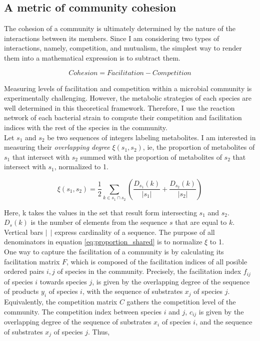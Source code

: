 \documentclass[titlepage,11pt]{article}
\begin{document}
\begin{linenumbers}
\begin{singlespace}
				\subsection{A metric of community cohesion}
					The cohesion of a community is ultimately determined by the nature of the interactions between its members. Since I am considering two types of interactions, namely, competition, and mutualism, the simplest way to render them into a mathematical expression is to subtract them.
					\begin{linenomath*}
						\begin{equation}\label{eq:cohesion_idea}
							Cohesion = Facilitation - Competition
						\end{equation}
					\end{linenomath*}
					Measuring levels of facilitation and competition within a microbial community is experimentally challenging. However, the metabolic strategies of each species are well determined in this theoretical framework. Therefore, I use the reaction network of each bacterial strain to compute their competition and facilitation indices with the rest of the species in the community.\\ 
					Let $ s_1 $ and $ s_2 $ be two sequences of integers labeling metabolites. I am interested in measuring  their \textit{overlapping degree} $ \xi(s_1, s_2) $, ie, the proportion of metabolites of $ s_1 $ that intersect with $ s_2 $ summed with the proportion of metabolites of $ s_2 $ that intersect with $ s_1 $, normalized to 1.
					\begin{linenomath*}	
						\begin{equation}\label{eq:proportion_shared}
							\xi (s_1, s_2) = \frac {1}{2} \sum_{k \in s_1 \cap s_2} \left(\frac{D_{s_1}(k)}{|s_1|} + \frac{D_{s_2}(k)}{|s_2|}\right)
						\end{equation}
					\end{linenomath*}	
					Here, k takes the values in the set that result form intersecting $ s_1 $ and $ s_2 $. $ D_s(k) $ is the number of elements from the sequence $ s $ that are equal to $ k $. Vertical bars $  | \ \ | $ express cardinality of a sequence. The purpose of all denominators in equation \ref{eq:proportion_shared} is to normalize $ \xi $ to 1.\\
					One way to capture the facilitation of a community is by calculating its facilitation matrix $ F $, which is composed of the facilitation indices of all posible ordered pairs $ i, j $ of species in the community. Precisely, the facilitation index $ f_{ij} $ of species $ i $ towards species $ j $, is given by the overlapping degree of the sequence of products $ y_i $ of species $ i $,  with the sequence of substrates $ x_j $ of species $ j $. Equivalently, the competition matrix $ C $ gathers the competition level of the community. The competition index between species $ i $ and $ j $,  $ c_{ij} $  is given by the overlapping degree of the sequence of substrates $ x_i $ of species $ i $,  and the sequence of substrates $ x_j $ of species $ j $. Thus, 

\end{singlespace}
\end{linenumbers}
\end{document}

